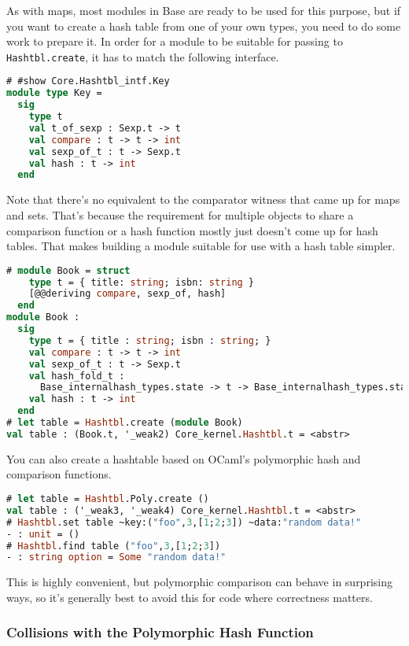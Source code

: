As with maps, most modules in Base are ready to be used for this
purpose, but if you want to create a hash table from one of your own
types, you need to do some work to prepare it. In order for a module to
be suitable for passing to \passthrough{\lstinline!Hashtbl.create!}, it
has to match the following interface.

\begin{lstlisting}[language=Caml]
# #show Core.Hashtbl_intf.Key
module type Key =
  sig
    type t
    val t_of_sexp : Sexp.t -> t
    val compare : t -> t -> int
    val sexp_of_t : t -> Sexp.t
    val hash : t -> int
  end
\end{lstlisting}

Note that there's no equivalent to the comparator witness that came up
for maps and sets. That's because the requirement for multiple objects
to share a comparison function or a hash function mostly just doesn't
come up for hash tables. That makes building a module suitable for use
with a hash table simpler.

\begin{lstlisting}[language=Caml]
# module Book = struct
    type t = { title: string; isbn: string }
    [@@deriving compare, sexp_of, hash]
  end
module Book :
  sig
    type t = { title : string; isbn : string; }
    val compare : t -> t -> int
    val sexp_of_t : t -> Sexp.t
    val hash_fold_t :
      Base_internalhash_types.state -> t -> Base_internalhash_types.state
    val hash : t -> int
  end
# let table = Hashtbl.create (module Book)
val table : (Book.t, '_weak2) Core_kernel.Hashtbl.t = <abstr>
\end{lstlisting}

You can also create a hashtable based on OCaml's polymorphic hash and
comparison functions.

\begin{lstlisting}[language=Caml]
# let table = Hashtbl.Poly.create ()
val table : ('_weak3, '_weak4) Core_kernel.Hashtbl.t = <abstr>
# Hashtbl.set table ~key:("foo",3,[1;2;3]) ~data:"random data!"
- : unit = ()
# Hashtbl.find table ("foo",3,[1;2;3])
- : string option = Some "random data!"
\end{lstlisting}

This is highly convenient, but polymorphic comparison can behave in
surprising ways, so it's generally best to avoid this for code where
correctness matters.

\hypertarget{collisions-with-the-polymorphic-hash-function}{%
\subsubsection{Collisions with the Polymorphic Hash
Function}\label{collisions-with-the-polymorphic-hash-function}}

